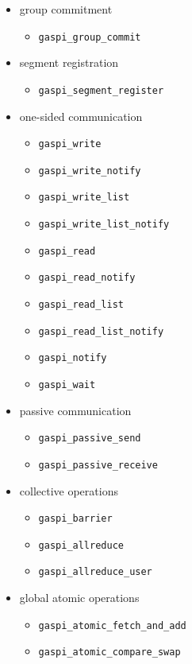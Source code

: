 \documentclass[a4paper]{article}
\newlength{\st}\setlength{\st}{0pt}
\newcommand{\zsep}[1]{#1}
\newcommand{\gaspiprefix}{gaspi}
\newcommand{\function}[1]{{\tt #1}}
\newcommand{\gaspifunction}[1]{\function{\protect\zsep{\gaspiprefix\_#1}}}
\begin{document}
\begin{itemize}
\item group commitment
  \begin{itemize}
    \item \gaspifunction{group\_commit}
  \end{itemize}
\item segment registration
  \begin{itemize}
    \item \gaspifunction{segment\_register}
  \end{itemize}
\item one-sided communication
  \begin{itemize}
    \item \gaspifunction{write}
    \item \gaspifunction{write\_notify}
    \item \gaspifunction{write\_list}
    \item \gaspifunction{write\_list\_notify}
    \item \gaspifunction{read}
    \item \gaspifunction{read\_notify}
    \item \gaspifunction{read\_list}
    \item \gaspifunction{read\_list\_notify}
    \item \gaspifunction{notify}
    \item \gaspifunction{wait}
  \end{itemize}
\item passive communication
  \begin{itemize}
    \item \gaspifunction{passive\_send}
    \item \gaspifunction{passive\_receive}
  \end{itemize}
\item collective operations
  \begin{itemize}
    \item \gaspifunction{barrier}
    \item \gaspifunction{allreduce}
    \item \gaspifunction{allreduce\_user}
  \end{itemize}
\item global atomic operations
  \begin{itemize}
    \item \gaspifunction{atomic\_fetch\_and\_add}
    \item \gaspifunction{atomic\_compare\_swap}
  \end{itemize}
\end{itemize}
\end{document}
